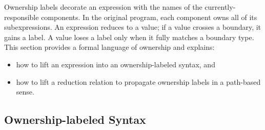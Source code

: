 
Ownership labels decorate an expression with the names of the currently-responsible
components. In
the original program, each component owns all of its subexpressions. An
expression reduces to a value; if a value crosses a boundary, it gains
a label.
A value loses a label only when it
fully matches a boundary type.  This section provides a formal language of
ownership and explains:
\begin{itemize}
  \item how to lift an expression into an ownership-labeled syntax, and
  \item how to lift a reduction relation to propagate ownership labels in a path-based sense.
\end{itemize}

\subsection{Ownership-labeled Syntax}

